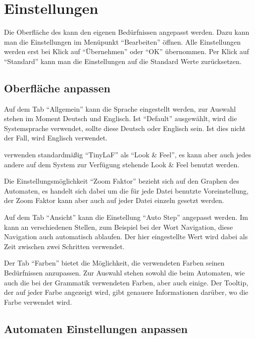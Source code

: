 \chapter{Einstellungen}\label{Preferences}

Die Oberfläche des \gtitools kann den eigenen Bedürfnissen angepasst werden.
Dazu kann man die Einstellungen im Menüpunkt "`Bearbeiten"' öffnen. Alle
Einstellungen werden erst bei Klick auf "`Übernehmen"' oder "`OK"' übernommen.
Per Klick auf "`Standard"' kann man die Einstellungen auf die Standard Werte
zurücksetzen.


\section{Oberfläche anpassen}

Auf dem Tab "`Allgemein"' kann die Sprache eingestellt werden, zur Auswahl
stehen im Moment Deutsch und Englisch. Ist "`Default"' ausgewählt, wird
die Systemsprache verwendet, sollte diese Deutsch oder Englisch sein. Ist dies
nicht der Fall, wird Englisch verwendet.\vspace{10pt}

\gtitool verwenden standardmäßig "`TinyLaF"' als "`Look \& Feel"', es kann aber
auch jedes andere auf dem System zur Verfügung stehende Look \& Feel benutzt
werden.\vspace{10pt}

Die Ein\-stell\-ungs\-möglich\-keit "`Zoom Faktor"' bezieht sich auf den Graphen 
des Automaten, es handelt sich dabei um die für jede Datei benutzte Voreinstellung,
der Zoom Faktor kann aber auch auf jeder Datei einzeln gesetzt werden.\vspace{10pt}

Auf dem Tab "`Ansicht"' kann die Einstellung "`Auto Step"' angepasst werden. Im
\gtitool kann an verschiedenen Stellen, zum Beispiel bei der Wort Navigation, diese
Navigation auch automatisch ablaufen. Der hier eingestellte Wert wird dabei
als Zeit zwischen zwei Schritten verwendet.\vspace{10pt}

Der Tab "`Farben"' bietet die Möglichkeit, die verwendeten Farben seinen
Be\-dürf\-nis\-sen anzupassen. Zur Auswahl stehen sowohl die beim Automaten, wie
auch die bei der Grammatik verwendeten Farben, aber auch einige. Der Tooltip,
der auf jeder Farbe angezeigt wird, gibt genauere Informationen darüber, wo
die Farbe verwendet wird.


\section{Automaten Einstellungen anpassen}


